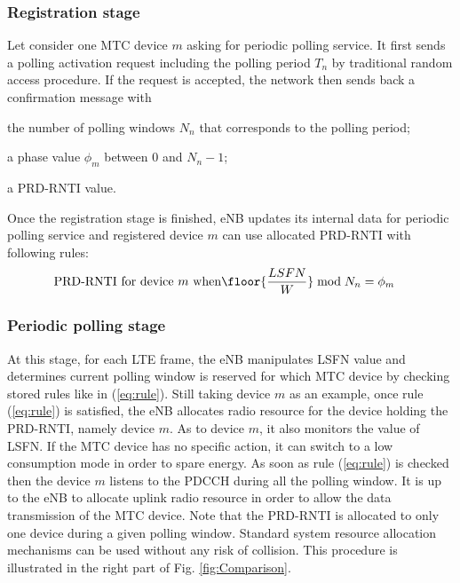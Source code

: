 \subsubsection{Registration stage} 
Let consider one MTC device $m$ asking for periodic polling service. It first sends a polling activation request including the polling period $T_n$ by traditional random access procedure. If the request is accepted, the network then sends back a confirmation message with \begin{inparaenum}[i)]
	\item the number of polling windows $N_n$ that corresponds to the polling period;
	\item a phase value $\phi _{m}$ between $0$ and $N_{n}-1$;
	\item a PRD-RNTI value.
\end{inparaenum}
Once the registration stage is finished, eNB updates its internal data for periodic polling service and registered device $m$ can use allocated PRD-RNTI with following rules: 
\begin{align}
&\textrm{PRD-RNTI for device $m$} \textrm{ when} \floor{\frac{LSFN}{W}}\bmod N_n=\phi _{m} \label{eq:rule}
\end{align}
\subsubsection{Periodic polling stage}
At this stage, for each LTE frame, the eNB manipulates LSFN value and determines current polling window is reserved for which MTC device by checking stored rules like in (\ref{eq:rule}). Still taking device $m$ as an example, once rule (\ref{eq:rule}) is satisfied, the eNB allocates radio resource for the device holding the PRD-RNTI, namely device $m$. As to device $m$, it also monitors the value of LSFN. If the MTC device has no specific action, it can switch to a low consumption mode in order to spare energy. As soon as rule (\ref{eq:rule}) is checked then the device $m$ listens to the PDCCH during all the polling window. It is up to the eNB to allocate uplink radio resource in order to allow the data transmission of the MTC device. Note that the PRD-RNTI is allocated to only one device during a given polling window. Standard system resource allocation mechanisms can be used without any risk of collision. This procedure is illustrated in the right part of Fig. \ref{fig:Comparison}.

